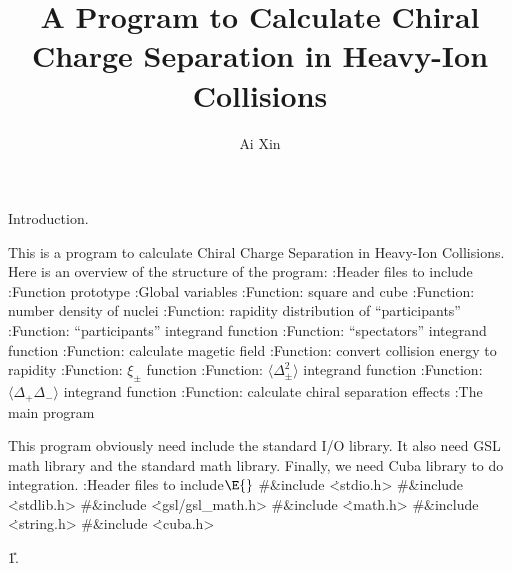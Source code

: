\documentclass{cweb}
\begin{document}
\title{A Program to Calculate Chiral Charge Separation in Heavy-Ion Collisions}
\author{Ai Xin}

\maketitle


Introduction.

This is a program to calculate Chiral Charge Separation in Heavy-Ion
Collisions.
Here is an overview of the structure of the program:
\Y\B{}:Header files to include\X\6
:Function prototype\X\6
:Global variables\X\6
:Function: square and cube\X\6
:Function: number density of nuclei\X\6
:Function: rapidity distribution of ``participants''\X\6
:Function: ``participants'' integrand function\X\6
:Function: ``spectators'' integrand function\X\6
:Function: calculate magetic field\X\6
:Function: convert collision energy to rapidity\X\6
:Function: $\xi_\pm$ function\X\6
:Function: $\langle \Delta_\pm^2 \rangle$ integrand function\X\6
:Function: $\langle \Delta_+ \Delta_- \rangle$ integrand function\X\6
:Function: calculate chiral separation effects\X\6
:The main program\X\par
\fi

This program obviously need include the standard I/O library. It also need
GSL math library and the standard math library. Finally, we need Cuba library
to do integration.
\Y\B\4:Header files to include\X${}\E{}$\6
\8\#\&{include} \.{<stdio.h>}\6
\8\#\&{include} \.{<stdlib.h>}\6
\8\#\&{include} \.{<gsl/gsl\_math.h>}\6
\8\#\&{include} \.{<math.h>}\6
\8\#\&{include} \.{<string.h>}\6
\8\#\&{include} \.{<cuba.h>}\par
\U1.\fi
\end{document}
